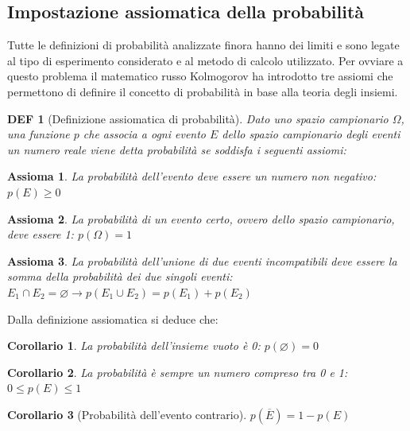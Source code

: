 \documentclass{article}     %
\newtheorem*{definition}{DEF}
\newtheorem{axiom}{Assioma}
\newtheorem{corollary}{Corollario}
\begin{document}
                \subsection{Impostazione assiomatica della probabilità}
                    Tutte le definizioni di probabilità analizzate finora hanno dei limiti e sono legate al tipo di esperimento considerato e al metodo di calcolo utilizzato. Per ovviare a questo problema il matematico russo Kolmogorov ha introdotto tre assiomi che permettono di definire il concetto di probabilità in base alla teoria degli insiemi.
                    \begin{definition}[Definizione assiomatica di probabilità]
                        Dato uno spazio campionario $\Omega$, una funzione $p$ che associa a ogni evento $E$ dello spazio campionario degli eventi un numero reale viene detta probabilità se soddisfa i seguenti assiomi:
                    \end{definition}
                    \begin{axiom}
                        La probabilità dell'evento deve essere un numero non negativo: $p(E) \geq 0$
                    \end{axiom}
                    \begin{axiom}
                        La probabilità di un evento certo, ovvero dello spazio campionario, deve essere 1: $p(\Omega)=1$
                    \end{axiom}
                    \begin{axiom}
                        La probabilità dell'unione di due eventi incompatibili deve essere la somma della probabilità dei due singoli eventi: $E_1\cap E_2 =\varnothing \rightarrow p(E_1\cup E_2)=p(E_1)+p(E_2)$ 
                    \end{axiom}
                    Dalla definizione assiomatica si deduce che:
                    \begin{corollary}
                        La probabilità dell'insieme vuoto è 0: $p(\varnothing)=0$
                    \end{corollary}
                    \begin{corollary}
                        La probabilità è sempre un numero compreso tra 0 e 1: $0\leq p(E)\leq 1$
                    \end{corollary}
                    \begin{corollary}[Probabilità dell'evento contrario]
                        $p(\overline{E})=1-p(E)$
                    \end{corollary}
\end{document}
